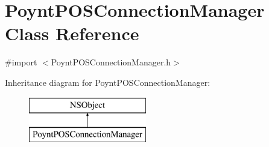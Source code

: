 \hypertarget{interface_poynt_p_o_s_connection_manager}{}\section{Poynt\+P\+O\+S\+Connection\+Manager Class Reference}
\label{interface_poynt_p_o_s_connection_manager}


{\ttfamily \#import $<$Poynt\+P\+O\+S\+Connection\+Manager.\+h$>$}

Inheritance diagram for Poynt\+P\+O\+S\+Connection\+Manager\+:\begin{figure}[H]
\begin{center}
\leavevmode
\includegraphics[height=2.000000cm]{interface_poynt_p_o_s_connection_manager}
\end{center}
\end{figure}
